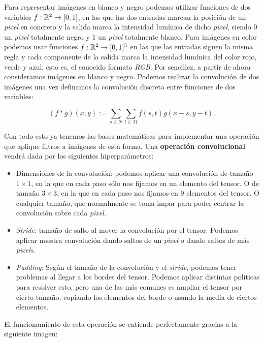 Para representar imágenes en blanco y negro podemos utilizar funciones de dos variables $f: \mathbb{R}^2 \to [0, 1]$, en las que las dos entradas marcan la posición de un \textit{pixel} en concreto y la salida marca la intensidad lumínica de dicho \textit{pixel}, siendo 0 un \textit{pixel} totalmente negro y 1 un \textit{pixel} totalmente blanco. Para imágenes en color podemos usar funciones $f: \mathbb{R}^2 \to [0,1]^3$ en las que las entradas siguen la misma regla y cada componente de la salida marca la intensidad lumínica del color rojo, verde y azul, esto es, el conocido formato \textit{RGB}. Por sencillez, a partir de ahora consideramos imágenes en blanco y negro. Podemos realizar la convolución de dos imágenes una vez definamos la convolución discreta entre funciones de dos variables:

\begin{equation}
    (f * g)(x, y) := \sum_{s \in N} \sum_{t \in M} f(s, t) g(x - s, y - t).
\end{equation}

Con todo esto ya tenemos las bases matemáticas para implementar una operación que aplique filtros a imágenes de esta forma. Una \textbf{operación convolucional} vendrá dada por los siguientes hiperparámetros:

\begin{itemize}
    \item Dimensiones de la convolución: podemos aplicar una convolución de tamaño $1 \times 1$, en la que en cada paso sólo nos fijamos en un elemento del tensor. O de tamaño $3 \times 3$, en la que en cada paso nos fijamos en 9 elementos del tensor. O cualquier tamaño, que normalmente se toma impar para poder centrar la convolución sobre cada \textit{pixel}.
    \item \textit{Stride}: tamaño de salto al mover la convolución por el tensor. Podemos aplicar nuestra convolución dando saltos de un \textit{pixel} o dando saltos de más \textit{pixels}.
    \item \textit{Padding}: Según el tamaño de la convolución y el \textit{stride}, podemos tener problemas al llegar a los bordes del tensor. Podemos aplicar distintas políticas para resolver esto, pero una de las más comunes es ampliar el tensor por cierto tamaño, copiando los elementos del borde o usando la media de ciertos elementos.
\end{itemize}

El funcionamiento de esta operación se entiende perfectamente gracias a la siguiente imagen:

